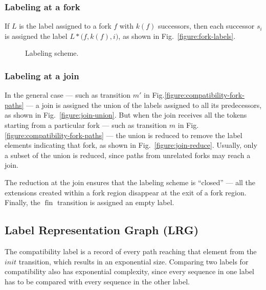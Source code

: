 \documentclass[conference]{IEEEtran}
\newcommand{\sym}[1]{$\operatorname{#1}$}
\begin{document}
\subsubsection{Labeling at a fork}

If $L$ is the label assigned to a fork $f$ with $k(f)$ successors,
then each successor $s_i$ is assigned the label $L *
\bigl(f,k(f),i\bigr)$, as shown in Fig.~\ref{figure:fork-labels}.

\begin{figure}[!t]
  \centering
  \caption{Labeling scheme.}
\end{figure}

\subsubsection{Labeling at a join}

In the general case --- such as transition $m'$ in
Fig.\ref{figure:compatibility-fork-paths} --- a join is assigned the
union of the labels assigned to all its predecessors, as shown in
Fig.~\ref{figure:join-union}. But when the join receives all the
tokens starting from a particular fork --- such as transition $m$ in
Fig.\ref{figure:compatibility-fork-paths} --- the union is reduced to
remove the label elements indicating that fork, as shown in
Fig.~\ref{figure:join-reduce}. Usually, only a subset of the union is
reduced, since paths from unrelated forks may reach a join.

The reduction at the join ensures that the labeling scheme is
``closed'' --- all the extensions created within a fork region
disappear at the exit of a fork region\cite{ahir_thesis}. Finally, the
\sym{fin} transition is assigned an empty label.

\subsection{Label Representation Graph (LRG)}

The compatibility label is a record of every path reaching that
element from the $init$ transition, which results in an exponential
size. Comparing two labels for compatibility also has exponential
complexity, since every sequence in one label has to be compared with
every sequence in the other label.
\end{document}
